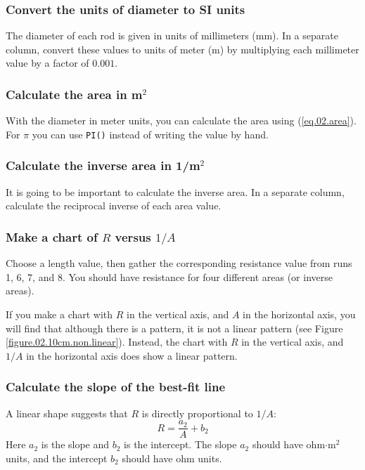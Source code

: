 \subsubsection{Convert the units of diameter to SI units}
The diameter of each rod is given in units of millimeters (mm). In a separate column, convert these values to units of meter (m) by multiplying each millimeter value by a factor of $0.001$.
\subsubsection{Calculate the area in m$^{2}$}
With the diameter in meter units, you can calculate the area using (\ref{eq.02.area}). For $\pi$ you can use \texttt{PI()} instead of writing the value by hand.
\subsubsection{Calculate the inverse area in 1/m$^{2}$}
It is going to be important to calculate the inverse area. In a separate column, calculate the reciprocal inverse of each area value.
\subsubsection{Make a chart of $R$ versus $1/A$}
Choose a length value, then gather the corresponding resistance value from runs 1, 6, 7, and 8. You should have resistance for four different areas (or inverse areas).

If you make a chart with $R$ in the vertical axis, and $A$ in the horizontal axis, you will find that although there is a pattern, it is not a linear pattern (see Figure \ref{figure.02.10cm.non.linear}). Instead, the chart with $R$ in the vertical axis, and $1/A$ in the horizontal axis does show a linear pattern.
\subsubsection{Calculate the slope of the best-fit line}
A linear shape suggests that $R$ is directly proportional to $1/A$:
\begin{equation}
	R = \frac{a_{2}}{A} + b_{2}
\end{equation}
Here $a_{2}$ is the slope and $b_{2}$ is the intercept. The slope $a_{2}$ should have ohm$\cdot$m$^{2}$ units, and the intercept $b_{2}$ should have ohm units.

